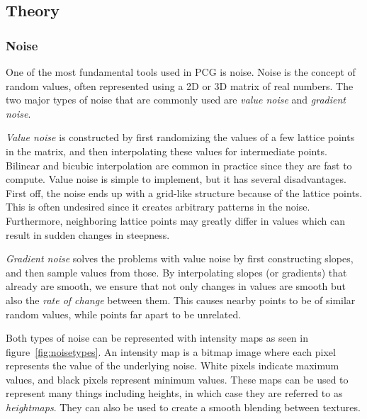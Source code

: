 \subsection{Theory}

\subsubsection{Noise}

One of the most fundamental tools used in PCG is noise.
Noise is the concept of random values, often represented using a 2D or 3D matrix of real numbers.
The two major types of noise that are commonly used are \textit{value noise} and \textit{gradient noise}.

\textit{Value noise} is constructed by first randomizing the values of a few lattice points in the matrix, and then interpolating these values for intermediate points.
Bilinear and bicubic interpolation are common in practice since they are fast to compute.
Value noise is simple to implement, but it has several disadvantages.
First off, the noise ends up with a grid-like structure because of the lattice points.
This is often undesired since it creates arbitrary patterns in the noise.
Furthermore, neighboring lattice points may greatly differ in values which can result in sudden changes in steepness.

\textit{Gradient noise} solves the problems with value noise by first constructing slopes, and then sample values from those.
By interpolating slopes (or gradients) that already are smooth, we ensure that not only changes in values are smooth but also the \textit{rate of change} between them.
This causes nearby points to be of similar random values, while points far apart to be unrelated.

Both types of noise can be represented with intensity maps as seen in figure~\ref{fig:noisetypes}.
An intensity map is a bitmap image where each pixel represents the value of the underlying noise.
White pixels indicate maximum values, and black pixels represent minimum values.
These maps can be used to represent many things including heights, in which case they are referred to as \textit{heightmaps}.
They can also be used to create a smooth blending between textures.

